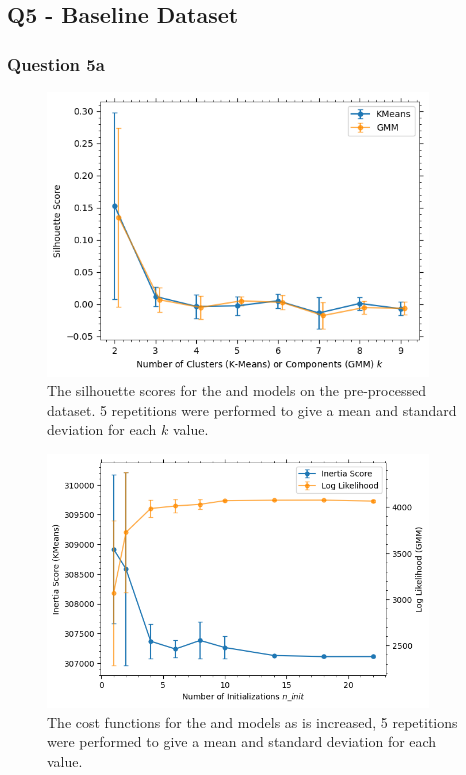 
\subsection{Q5 - Baseline Dataset}\label{subsec:q5}
\subsubsection{Question 5a}\label{subsubsec:q5a}
    \begin{figure}[htb]
    \centering
    \includegraphics[width=0.9\textwidth]{./figures/q5a_silhouette_scores}
    \caption{The silhouette scores for the  and  models on the pre-processed
         dataset. 5 repetitions were performed to give a mean and standard deviation
        for each $k$ value.}
    \label{fig:q5a_silhouette_scores}
    \end{figure}

    \begin{figure}[htb]
    \centering
    \includegraphics[width=0.9\textwidth]{./figures/q5a_n_init_optimisation}
    \caption{The cost functions for the  and  models as  is
        increased, 5 repetitions were performed to give a mean and standard deviation for each  value.}
    \label{fig:q5a_n_init_optimisation}
    \end{figure}

